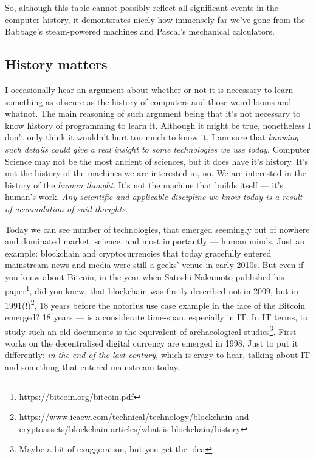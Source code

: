 \documentclass{report}
\begin{document}
            So, although this table cannot possibly reflect all significant events in the computer history, it demontsrates nicely how immensely far we've gone from the
            Babbage's steam-powered machines and Pascal's mechanical calculators. \par

            \subsection{History matters}

            I occasionally hear an argument about whether or not it is necessary to learn something as obscure as the history of computers and those weird looms and whatnot. The main
            reasoning of such argument being that it's not necessary to know history of programming to learn it. Although it might be true, nonetheless I don't only think it 
            wouldn't hurt too much to know it, I am sure that \emph{knowing such details could give a real insight to some technologies we use today}. Computer Science
            may not be the most ancient of sciences, but it does have it's history. It's not the history of the machines we are interested in, no. We are interested in 
            the history of the \emph{human thought}. It's not the machine that builds itself --- it's human's work. \emph{Any scientific and applicable discipline we know today
            is a result of accumulation of said thoughts}. \par
            
            Today we can see number of technologies, that emerged seemingly out of nowhere and dominated market, science, and 
            most importantly --- human minds. Just an example: blockchain and cryptocurrencies that today gracefully entered mainstream news and media were still a geeks'
            venue in early 2010s. But even if you knew about Bitcoin, in the year when Satoshi Nakamoto published his paper\footnote{\href{https://bitcoin.org/bitcoin.pdf}
            {https://bitcoin.org/bitcoin.pdf}}, did you knew, that blockchain was firstly described not in 2009, but in 
            1991(!)\footnote{\href{https://www.icaew.com/technical/technology/blockchain-and-cryptoassets/blockchain-articles/what-is-blockchain/history}
            {https://www.icaew.com/technical/technology/blockchain-and-cryptoassets/blockchain-articles/what-is-blockchain/history}}, 18 years before the notorius use case example
            in the face of the Bitcoin emerged? 18 years --- is a considerate time-span, especially in IT. In IT terms, to study such an old documents is the equivalent of
            archaeological studies\footnote{Maybe a bit of exaggeration, but you get the idea}. First works on the decentralised digital currency are emerged in 1998. Just to
            put it differently: \emph{in the end of the last century}, which is crazy to hear, talking about IT and something that entered mainstream today. \par
\end{document}
